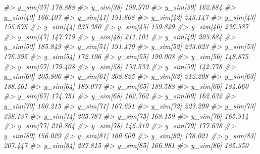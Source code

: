 \documentclass[
  10pt,
  italian,
  a4paper,
  extrafontsizes,onecolumn,openright
  ]{memoir}
\newenvironment{Shaded}{\begin{snugshade}}{\end{snugshade}}
\newcommand{\CommentTok}[1]{\textcolor[rgb]{0.56,0.35,0.01}{\textit{#1}}}
\begin{document}
\begin{Shaded}
\begin{Highlighting}[]
\CommentTok{\#\textgreater{}   y\_sim[37]  178.888}
\CommentTok{\#\textgreater{}   y\_sim[38]  199.970}
\CommentTok{\#\textgreater{}   y\_sim[39]  162.884}
\CommentTok{\#\textgreater{}   y\_sim[40]  166.407}
\CommentTok{\#\textgreater{}   y\_sim[41]  191.808}
\CommentTok{\#\textgreater{}   y\_sim[42]  243.147}
\CommentTok{\#\textgreater{}   y\_sim[43]  155.675}
\CommentTok{\#\textgreater{}   y\_sim[44]  235.380}
\CommentTok{\#\textgreater{}   y\_sim[45]  159.829}
\CommentTok{\#\textgreater{}   y\_sim[46]  236.587}
\CommentTok{\#\textgreater{}   y\_sim[47]  147.719}
\CommentTok{\#\textgreater{}   y\_sim[48]  211.101}
\CommentTok{\#\textgreater{}   y\_sim[49]  205.884}
\CommentTok{\#\textgreater{}   y\_sim[50]  185.849}
\CommentTok{\#\textgreater{}   y\_sim[51]  191.470}
\CommentTok{\#\textgreater{}   y\_sim[52]  233.023}
\CommentTok{\#\textgreater{}   y\_sim[53]  176.995}
\CommentTok{\#\textgreater{}   y\_sim[54]  172.196}
\CommentTok{\#\textgreater{}   y\_sim[55]  190.008}
\CommentTok{\#\textgreater{}   y\_sim[56]  148.875}
\CommentTok{\#\textgreater{}   y\_sim[57]  179.408}
\CommentTok{\#\textgreater{}   y\_sim[58]  153.533}
\CommentTok{\#\textgreater{}   y\_sim[59]  142.778}
\CommentTok{\#\textgreater{}   y\_sim[60]  205.806}
\CommentTok{\#\textgreater{}   y\_sim[61]  208.825}
\CommentTok{\#\textgreater{}   y\_sim[62]  212.208}
\CommentTok{\#\textgreater{}   y\_sim[63]  188.461}
\CommentTok{\#\textgreater{}   y\_sim[64]  189.077}
\CommentTok{\#\textgreater{}   y\_sim[65]  189.588}
\CommentTok{\#\textgreater{}   y\_sim[66]  184.660}
\CommentTok{\#\textgreater{}   y\_sim[67]  174.751}
\CommentTok{\#\textgreater{}   y\_sim[68]  162.762}
\CommentTok{\#\textgreater{}   y\_sim[69]  162.632}
\CommentTok{\#\textgreater{}   y\_sim[70]  160.215}
\CommentTok{\#\textgreater{}   y\_sim[71]  167.691}
\CommentTok{\#\textgreater{}   y\_sim[72]  227.299}
\CommentTok{\#\textgreater{}   y\_sim[73]  238.137}
\CommentTok{\#\textgreater{}   y\_sim[74]  205.787}
\CommentTok{\#\textgreater{}   y\_sim[75]  168.159}
\CommentTok{\#\textgreater{}   y\_sim[76]  165.914}
\CommentTok{\#\textgreater{}   y\_sim[77]  210.864}
\CommentTok{\#\textgreater{}   y\_sim[78]  145.310}
\CommentTok{\#\textgreater{}   y\_sim[79]  177.638}
\CommentTok{\#\textgreater{}   y\_sim[80]  156.029}
\CommentTok{\#\textgreater{}   y\_sim[81]  160.609}
\CommentTok{\#\textgreater{}   y\_sim[82]  178.021}
\CommentTok{\#\textgreater{}   y\_sim[83]  207.447}
\CommentTok{\#\textgreater{}   y\_sim[84]  237.815}
\CommentTok{\#\textgreater{}   y\_sim[85]  166.981}
\CommentTok{\#\textgreater{}   y\_sim[86]  185.350}

\end{Highlighting}
\end{Shaded}
\end{document}
